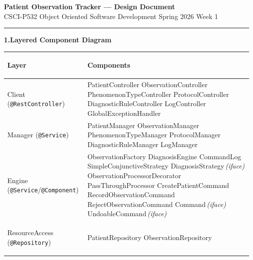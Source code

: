 \documentclass[9pt]{article}
\begin{document}
{\centering
  {\large\bfseries Patient Observation Tracker — Design Document}\\[1pt]
  {\small CSCI-P532 Object Oriented Software Development \textbar{}
          Spring 2026 \textbar{} Week 1}\par
}
\vspace{3pt}\hrule\vspace{5pt}

{\small\bfseries 1.\enspace Layered Component Diagram}
\vspace{3pt}

\noindent
{\scriptsize
\begin{tabularx}{\linewidth}{@{}
    >{\bfseries\raggedright\arraybackslash}p{2.6cm}
    >{\raggedright\arraybackslash}X
  @{}}
\toprule
\textbf{Layer} & \textbf{Components} \\
\midrule
Client \newline\mdseries(\texttt{@RestController}) &
  PatientController \textbullet{} ObservationController \textbullet{}
  PhenomenonTypeController \textbullet{} ProtocolController \textbullet{}
  DiagnosticRuleController \textbullet{} LogController \textbullet{}
  GlobalExceptionHandler \\[2pt]
Manager \newline\mdseries(\texttt{@Service}) &
  PatientManager \textbullet{} ObservationManager \textbullet{}
  PhenomenonTypeManager \textbullet{} ProtocolManager \textbullet{}
  DiagnosticRuleManager \textbullet{} LogManager \\[2pt]
Engine \newline\mdseries(\texttt{@Service}/\texttt{@Component}) &
  ObservationFactory \textbullet{} DiagnosisEngine \textbullet{} CommandLog \textbullet{}
  SimpleConjunctiveStrategy \textbullet{} DiagnosisStrategy\,\textit{(iface)} \textbullet{}
  ObservationProcessorDecorator \textbullet{} PassThroughProcessor \textbullet{}
  CreatePatientCommand \textbullet{} RecordObservationCommand \textbullet{}
  RejectObservationCommand \textbullet{} Command\,\textit{(iface)} \textbullet{} UndoableCommand\,\textit{(iface)} \\[2pt]
ResourceAccess \newline\mdseries(\texttt{@Repository}) &
  PatientRepository \textbullet{} ObservationRepository \textbullet{}

\end{tabularx}}
\end{document}
